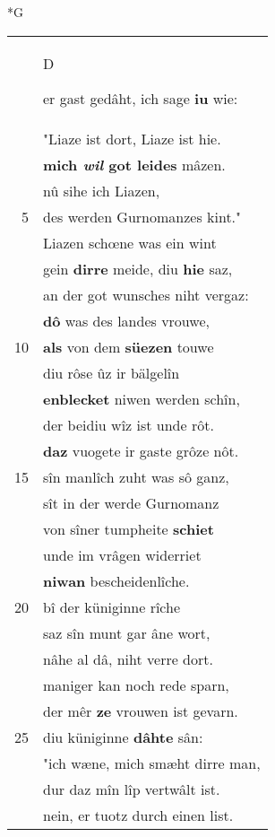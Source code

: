 \documentclass[8pt,a4paper,notitlepage]{article}
\begin{document}
\newpage
\begin{table}[ht]
\begin{minipage}[t]{0.5\linewidth}
\small
\begin{center}*G
\end{center}
\begin{tabular}{rl}
 & \begin{large}D\end{large}er gast gedâht, ich sage \textbf{iu} wie:\\ 
 & "Liaze ist dort, Liaze ist hie.\\ 
 & \textbf{mich \textit{wil} got leides} mâzen.\\ 
 & nû sihe ich Liazen,\\ 
5 & des werden Gurnomanzes kint."\\ 
 & Liazen schœne was ein wint\\ 
 & gein \textbf{dirre} meide, diu \textbf{hie} saz,\\ 
 & an der got wunsches niht vergaz:\\ 
 & \textbf{dô} was des landes vrouwe,\\ 
10 & \textbf{als} von dem \textbf{süezen} touwe\\ 
 & diu rôse ûz ir bälgelîn\\ 
 & \textbf{enblecket} niwen werden schîn,\\ 
 & der beidiu wîz ist unde rôt.\\ 
 & \textbf{daz} vuogete ir gaste grôze nôt.\\ 
15 & sîn manlîch zuht was sô ganz,\\ 
 & sît in der werde Gurnomanz\\ 
 & von sîner tumpheite \textbf{schiet}\\ 
 & unde im vrâgen widerriet\\ 
 & \textbf{niwan} bescheidenlîche.\\ 
20 & bî der küniginne rîche\\ 
 & saz sîn munt gar âne wort,\\ 
 & nâhe al dâ, niht verre dort.\\ 
 & maniger kan noch rede sparn,\\ 
 & der mêr \textbf{ze} vrouwen ist gevarn.\\ 
25 & diu küniginne \textbf{dâhte} sân:\\ 
 & "ich wæne, mich smæht dirre man,\\ 
 & dur daz mîn lîp vertwâlt ist.\\ 
 & nein, er tuotz durch einen list.\\ 

\end{tabular}
\end{minipage}
\end{table}
\end{document}
